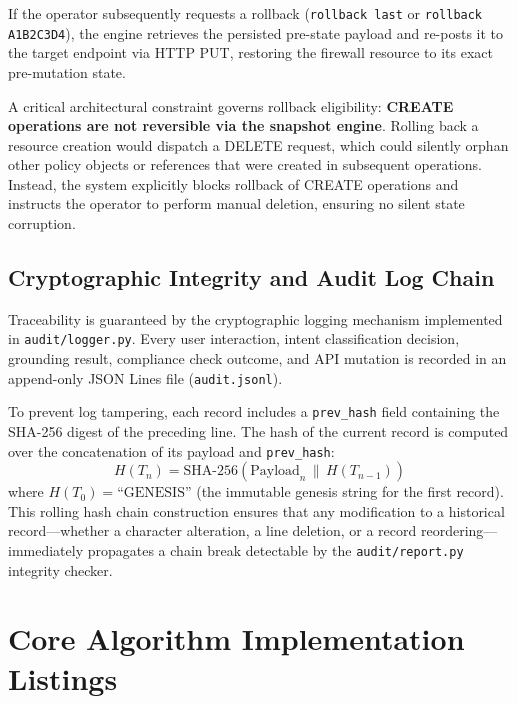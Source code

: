 If the operator subsequently requests a rollback (\texttt{rollback last} or \texttt{rollback A1B2C3D4}), the engine retrieves the persisted pre-state payload and re-posts it to the target endpoint via HTTP PUT, restoring the firewall resource to its exact pre-mutation state.

A critical architectural constraint governs rollback eligibility: \textbf{CREATE operations are not reversible via the snapshot engine}. Rolling back a resource creation would dispatch a DELETE request, which could silently orphan other policy objects or references that were created in subsequent operations. Instead, the system explicitly blocks rollback of CREATE operations and instructs the operator to perform manual deletion, ensuring no silent state corruption.

\subsection{Cryptographic Integrity and Audit Log Chain}
\label{subsec:audit}

Traceability is guaranteed by the cryptographic logging mechanism implemented in \texttt{audit/logger.py}. Every user interaction, intent classification decision, grounding result, compliance check outcome, and API mutation is recorded in an append-only JSON Lines file (\texttt{audit.jsonl}).

To prevent log tampering, each record includes a \texttt{prev\_hash} field containing the SHA-256 digest of the preceding line. The hash of the current record is computed over the concatenation of its payload and \texttt{prev\_hash}:
\begin{equation}
    H(T_n) = \mathrm{SHA\text{-}256}\!\left( \mathrm{Payload}_n \,\|\, H(T_{n-1}) \right)
    \label{eq:hash_chain}
\end{equation}
where $H(T_0) = \text{``GENESIS''}$ (the immutable genesis string for the first record). This rolling hash chain construction ensures that any modification to a historical record—whether a character alteration, a line deletion, or a record reordering—immediately propagates a chain break detectable by the \texttt{audit/report.py} integrity checker.

\section{Core Algorithm Implementation Listings}
\label{sec:listings}

